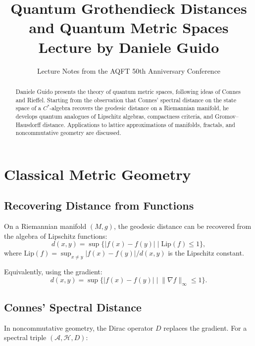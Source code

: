 \documentclass[11pt,a4paper]{article}
\title{\textbf{Quantum Grothendieck Distances\\and Quantum Metric Spaces}\\[6pt]
\large Lecture by Daniele Guido}
\author{Lecture Notes from the AQFT 50th Anniversary Conference}
\date{}
\begin{document}
\maketitle

\begin{abstract}
Daniele Guido presents the theory of quantum metric spaces, following ideas of
Connes and Rieffel. Starting from the observation that Connes' spectral distance
on the state space of a $C^*$-algebra recovers the geodesic distance on a
Riemannian manifold, he develops quantum analogues of Lipschitz algebras,
compactness criteria, and Gromov--Hausdorff distance. Applications to lattice
approximations of manifolds, fractals, and noncommutative geometry are discussed.
\end{abstract}

\tableofcontents

\section{Classical Metric Geometry}

\subsection{Recovering Distance from Functions}

On a Riemannian manifold $(M, g)$, the geodesic distance can be recovered
from the algebra of Lipschitz functions:
\begin{equation}
  d(x, y) = \sup\bigl\{|f(x) - f(y)| \;\big|\; \mathrm{Lip}(f) \leq 1\bigr\},
\end{equation}
where $\mathrm{Lip}(f) = \sup_{x \neq y} |f(x) - f(y)|/d(x,y)$ is the
Lipschitz constant.

Equivalently, using the gradient:
\begin{equation}
  d(x, y) = \sup\bigl\{|f(x) - f(y)| \;\big|\; \|\nabla f\|_\infty \leq 1\bigr\}.
\end{equation}

\subsection{Connes' Spectral Distance}

In noncommutative geometry, the Dirac operator $D$ replaces the gradient.
For a spectral triple $(\mathcal{A}, \mathcal{H}, D)$:
\end{document}
